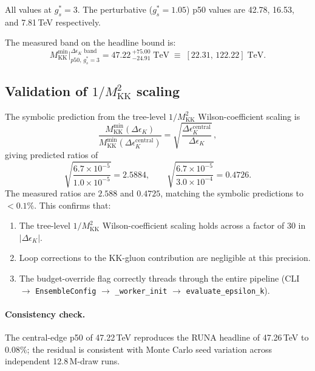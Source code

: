 \documentclass[11pt]{article}
\newcommand{\Mkk}{M_{\mathrm{KK}}}
\newcommand{\gs}{g_s^*}
\newcommand{\eK}{\epsilon_K}
\newcommand{\DeK}{\Delta\eK}
\begin{document}
All values at $\gs = 3$.  The perturbative ($\gs = 1.05$) p50
values are 42.78, 16.53, and 7.81\,TeV respectively.

The measured band on the headline bound is:
\begin{equation}\label{eq:band}
  \Mkk^{\min}\big|_{p50,\,\gs=3}^{\DeK\text{ band}}
  = 47.22\,^{+75.00}_{-24.91}\;\mathrm{TeV}
  \;\equiv\;
  [22.31,\, 122.22]\;\mathrm{TeV}.
\end{equation}

\subsection{Validation of $1/\Mkk^2$ scaling}
\label{sec:scaling}

The symbolic prediction from the tree-level $1/\Mkk^2$
Wilson-coefficient scaling is
\begin{equation}\label{eq:symbolic}
  \frac{\Mkk^{\min}(\DeK)}{\Mkk^{\min}(\DeK^{\mathrm{central}})}
  = \sqrt{\frac{\DeK^{\mathrm{central}}}{\DeK}}\,,
\end{equation}
giving predicted ratios of
\[
  \sqrt{\frac{6.7\times10^{-5}}{1.0\times10^{-5}}} = 2.5884,\qquad
  \sqrt{\frac{6.7\times10^{-5}}{3.0\times10^{-4}}} = 0.4726.
\]
The measured ratios are $2.588$ and $0.4725$, matching the symbolic
predictions to $< 0.1\%$.  This confirms that:
\begin{enumerate}[nosep]
  \item The tree-level $1/\Mkk^2$ Wilson-coefficient scaling holds
    across a factor of 30 in $|\DeK|$.
  \item Loop corrections to the KK-gluon contribution are negligible
    at this precision.
  \item The budget-override flag correctly threads through the entire
    pipeline (CLI $\to$ \texttt{EnsembleConfig} $\to$
    \texttt{\_worker\_init} $\to$ \texttt{evaluate\_epsilon\_k}).
\end{enumerate}

\paragraph{Consistency check.}
The central-edge p50 of 47.22\,TeV reproduces the RUNA headline of
47.26\,TeV to $0.08\%$; the residual is consistent with Monte Carlo
seed variation across independent 12.8\,M-draw runs.


\end{document}
